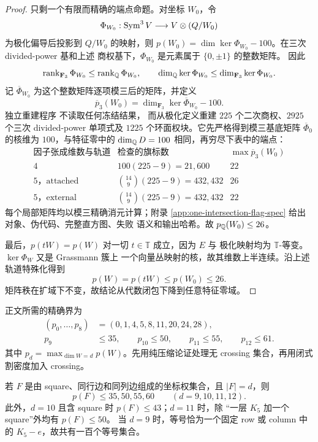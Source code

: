 \begin{proof}
只剩一个有限而精确的端点命题。对坐标 \(W_0\)，令
\[
 \Phi_{W_0}:\operatorname{Sym}^3V\longrightarrow V\otimes(Q/W_0)
\]
为极化偏导后投影到 \(Q/W_0\) 的映射，则
\(p(W_0)=\dim\ker\Phi_{W_0}-100\)。在三次 divided-power 基和上述
商权基下，\(\Phi_{W_0}\) 是元素属于 \(\{0,\pm1\}\) 的整数矩阵。
因此
\[
 \operatorname{rank}_{\mathbf F_3}\Phi_{W_0}
 \le\operatorname{rank}_{\mathbb Q}\Phi_{W_0},\qquad
 \dim_{\mathbb Q}\ker\Phi_{W_0}
 \le\dim_{\mathbf F_3}\ker\Phi_{W_0}.
\]
记 \(\overline\Phi_{W_0}\) 为这个整数矩阵逐项模三后的矩阵，并定义
\[
 \overline p_3(W_0)=
 \dim_{\mathbf F_3}\ker\overline\Phi_{W_0}-100.
\]
独立重建程序
 不读取任何冻结结果，
而从极化定义重建 \(225\) 个二次商权、\(2925\) 个三次 divided-power
单项式及 \(1225\) 个环面权块。它先严格得到模三基底矩阵
\(\overline\Phi_0\) 的核维为 \(100\)，与特征零中的
\(\dim_{\mathbb Q}D=100\) 相同，再穷尽下表中的端点：
\begin{equation}\label{n5:eq:oneflag-finite-table}
\begin{array}{c|r|c}
\text{因子张成维数与轨道}&\text{检查的旗标数}&
 \max \overline p_3(W_0)\\ \hline
4&100(225-9)=21{,}600&22\\
5\text{，attached}&\binom{14}{9}(225-9)=432{,}432&26\\
5\text{，external}&\binom{14}{9}(225-9)=432{,}432&22
\end{array}
\end{equation}
每个局部矩阵均以模三精确消元计算；附录
\ref{app:one-intersection-flag-spec} 给出对象、伪代码、完整直方图、失败
语义和输出哈希。故 \(p_{\mathbb Q}(W_0)\le26\)。

最后，\(p(tW)=p(W)\) 对一切 \(t\in\mathbb T\) 成立，因为 \(E\) 与
极化映射均为 \(\mathbb T\)-等变。\(\ker\Phi_W\) 又是 Grassmann 簇上
一个向量丛映射的核，故其维数上半连续。沿上述轨道特殊化得到
\[
 p(W)=p(tW)\le p(W_0)\le26.
\]
矩阵秩在扩域下不变，故结论从代数闭包下降到任意特征零域。
\end{proof}

正文所需的精确界为
\begin{equation}\label{n5:eq:p-small}
\begin{aligned}
 (p_0,\ldots,p_8)&=(0,1,4,5,8,11,20,24,28),\\
 p_9&\le35,\qquad p_{10}\le50,\qquad
 p_{11}\le55,\qquad p_{12}\le61.
\end{aligned}
\end{equation}
其中 \(p_d=\max_{\dim W=d}p(W)\)。先用纯压缩论证处理无 crossing
集合，再用闭式割密度加入 crossing。

\begin{lemma}
\label{n5:lem:nocrossing}
若 \(F\) 是由 square、同行边和同列边组成的坐标权集合，且
\(|F|=d\)，则
\[
 p(F)\le35,50,55,60\qquad(d=9,10,11,12).
\]
此外，\(d=10\) 且含 square 时 \(p(F)\le43\)；\(d=11\) 时，除
“一层 \(K_5\) 加一个 square”外均有 \(p(F)\le50\)。
当 \(d=9\) 时，等号恰为一个固定 row 或 column 中的
\(K_5-e\)，故共有一百个等号集合。
\end{lemma}

